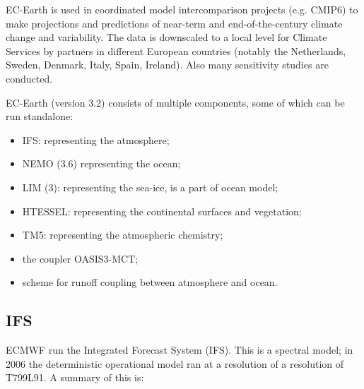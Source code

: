 EC-Earth is used in coordinated model intercomparison projects (e.g. CMIP6) to make projections and predictions 
of near-term and end-of-the-century climate change and variability. The data is downscaled to a local level for 
Climate Services by partners in different European countries (notably the Netherlands, Sweden, Denmark, Italy, Spain, 
Ireland). Also many sensitivity studies are conducted.


EC-Earth (version 3.2) consists of multiple components, some of which can be run standalone:
\begin{itemize}
    \item IFS: representing the atmosphere;
    \item NEMO (3.6) representing the ocean;
    \item LIM (3): representing the sea-ice, is a part of ocean model;
    \item HTESSEL: representing the continental surfaces and vegetation;
    \item TM5: representing the atmospheric chemistry;
    \item the coupler OASIS3-MCT;
    \item scheme for runoff coupling between atmosphere and ocean.
\end{itemize}

\subsection{IFS}

\iffalse
ECMWF run the Integrated Forecast System (IFS). This is a spectral model; in 2006 the deterministic operational model ran at a resolution of 
a resolution of T799L91. A summary of this is:

